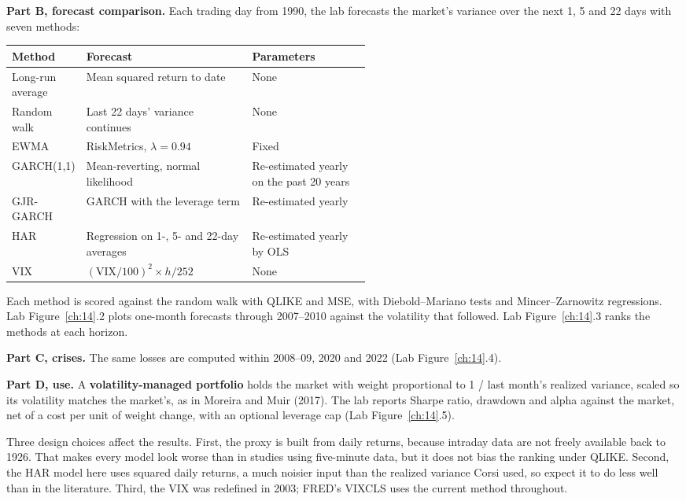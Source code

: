 \textbf{Part B, forecast comparison.} Each trading day from 1990, the lab forecasts the market's variance over the next 1, 5 and 22 days with seven methods:

\begin{center}
\small
\begin{tabularx}{0.9\linewidth}{@{}>{\raggedright\arraybackslash}p{0.20\linewidth}>{\raggedright\arraybackslash}X>{\raggedright\arraybackslash}p{0.33\linewidth}@{}}
\toprule
Method & Forecast & Parameters \\
\midrule
Long-run average & Mean squared return to date & None \\
Random walk & Last 22 days' variance continues & None \\
EWMA & RiskMetrics, $\lambda = 0.94$ & Fixed \\
GARCH(1,1) & Mean-reverting, normal likelihood & Re-estimated yearly on the past 20 years \\
GJR-GARCH & GARCH with the leverage term & Re-estimated yearly \\
HAR & Regression on 1-, 5- and 22-day averages & Re-estimated yearly by OLS \\
VIX & $(\mathrm{VIX}/100)^2 \times h/252$ & None \\
\bottomrule
\end{tabularx}
\end{center}

Each method is scored against the random walk with QLIKE and MSE, with Diebold--Mariano tests and Mincer--Zarnowitz regressions. Lab Figure~\ref{ch:14}.2 plots one-month forecasts through 2007--2010 against the volatility that followed. Lab Figure~\ref{ch:14}.3 ranks the methods at each horizon.

\textbf{Part C, crises.} The same losses are computed within 2008--09, 2020 and 2022 (Lab Figure~\ref{ch:14}.4).

\textbf{Part D, use.} A \textbf{volatility-managed portfolio} holds the market with weight proportional to 1 / last month's realized variance, scaled so its volatility matches the market's, as in Moreira and Muir (2017). The lab reports Sharpe ratio, drawdown and alpha against the market, net of a cost per unit of weight change, with an optional leverage cap (Lab Figure~\ref{ch:14}.5).

Three design choices affect the results. First, the proxy is built from daily returns, because intraday data are not freely available back to 1926. That makes every model look worse than in studies using five-minute data, but it does not bias the ranking under QLIKE. Second, the HAR model here uses squared daily returns, a much noisier input than the realized variance Corsi used, so expect it to do less well than in the literature. Third, the VIX was redefined in 2003; FRED's VIXCLS uses the current method throughout.

